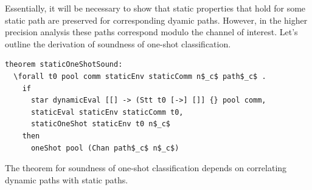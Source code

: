 \documentclass[letterpaper, 11pt]{extarticle}
\begin{document}
Essentially, it will be necessary to show that static
properties that hold for some static path are preserved for corresponding dyamic paths. 
However, in the higher precision analysis these paths correspond modulo the channel of interest.
Let's outline the derivation of soundness of one-shot classification.

\begin{lstlisting}[language=logic, mathescape]
  theorem staticOneShotSound:
  \forall t0 pool comm staticEnv staticComm n$_c$ path$_c$ . 
    if
      star dynamicEval [[] -> (Stt t0 [->] []] {} pool comm,
      staticEval staticEnv staticComm t0,
      staticOneShot staticEnv t0 n$_c$
    then 
      oneShot pool (Chan path$_c$ n$_c$)
\end{lstlisting}

The theorem for soundness of one-shot classification depends on
correlating dynamic paths with static paths.
\end{document}
